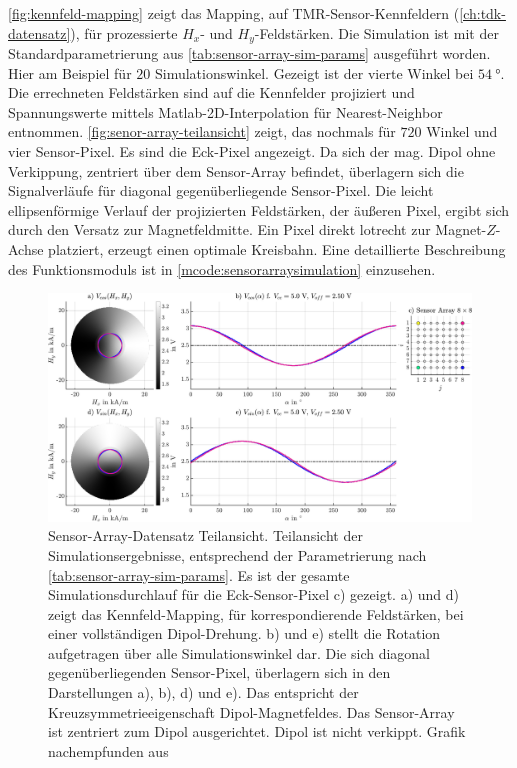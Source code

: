 \autoref{fig:kennfeld-mapping} zeigt das Mapping, auf TMR-Sensor-Kennfeldern (\autoref{ch:tdk-datensatz}), für prozessierte $H_x$- und $H_y$-Feldstärken. Die Simulation ist mit der Standardparametrierung aus \autoref{tab:sensor-array-sim-params} ausgeführt worden. Hier am Beispiel für $20$ Simulationswinkel. Gezeigt ist der vierte Winkel bei $\SI{54}{\degree}$. Die errechneten Feldstärken sind auf die Kennfelder projiziert und Spannungswerte mittels Matlab-2D-Interpolation für Nearest-Neighbor entnommen. \autoref{fig:senor-array-teilansicht} zeigt, das nochmals für $720$ Winkel und vier Sensor-Pixel. Es sind die Eck-Pixel angezeigt. Da sich der mag. Dipol ohne Verkippung, zentriert über dem Sensor-Array befindet, überlagern sich die Signalverläufe für diagonal gegenüberliegende Sensor-Pixel. Die leicht ellipsenförmige Verlauf der projizierten Feldstärken, der äußeren Pixel, ergibt sich durch den Versatz zur Magnetfeldmitte. Ein Pixel direkt lotrecht zur Magnet-$Z$-Achse platziert, erzeugt einen optimale Kreisbahn. Eine detaillierte Beschreibung des Funktionsmoduls ist in \autoref{mcode:sensorarraysimulation} einzusehen.


\vspace{4mm}
\begin{figure}[bph]
	\centering
	\includegraphics[width=\linewidth]{appendix/images/5-Sensor-Array-Sim-Imp/Senor-Array-Teilansicht}
	\caption[Sensor-Array-Datensatz Teilansicht]{Sensor-Array-Datensatz Teilansicht. Teilansicht der Simulationsergebnisse, entsprechend der Parametrierung nach \autoref{tab:sensor-array-sim-params}. Es ist der gesamte Simulationsdurchlauf für die Eck-Sensor-Pixel c) gezeigt. a) und d) zeigt das Kennfeld-Mapping, für korrespondierende Feldstärken, bei einer vollständigen Dipol-Drehung. b) und e) stellt die Rotation aufgetragen über alle Simulationswinkel dar. Die sich diagonal gegenüberliegenden Sensor-Pixel, überlagern sich in den Darstellungen a), b), d) und e). Das entspricht der Kreuzsymmetrieeigenschaft Dipol-Magnetfeldes. Das Sensor-Array ist zentriert zum Dipol ausgerichtet. Dipol ist nicht verkippt. Grafik nachempfunden aus \cite{Schuethe2019}}
	\label{fig:senor-array-teilansicht}
\end{figure}
